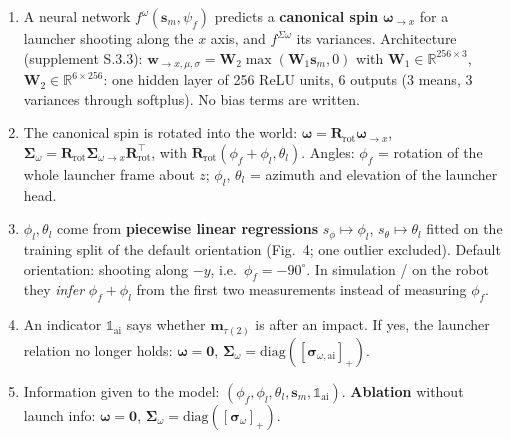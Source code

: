 \documentclass[11pt,a4paper]{article}
\newcommand{\mm}{\mathbf{m}}
\newcommand{\ww}{\boldsymbol{\omega}}
\newcommand{\SSigma}{\boldsymbol{\Sigma}}
\newcommand{\splus}[1]{[#1]_+}
\begin{document}
\begin{enumerate}
\item A neural network $f^\omega(\mathbf s_m,\psi_f)$ predicts a \textbf{canonical spin} $\ww_{\rightarrow x}$ for a launcher shooting along the $x$ axis, and $f^{\Sigma\omega}$ its variances. Architecture (supplement S.3.3):
$\mathbf w_{\rightarrow x,\mu,\sigma}=\mathbf W_2\max(\mathbf W_1\mathbf s_m,0)$ with $\mathbf W_1\in\mathbb R^{256\times3}$, $\mathbf W_2\in\mathbb R^{6\times256}$: one hidden layer of 256 ReLU units, 6 outputs (3 means, 3 variances through softplus). No bias terms are written.
\item The canonical spin is rotated into the world: $\ww=\mathbf R_{\text{rot}}\ww_{\rightarrow x}$, $\SSigma_\omega=\mathbf R_{\text{rot}}\SSigma_{\omega\rightarrow x}\mathbf R_{\text{rot}}^\top$, with $\mathbf R_{\text{rot}}(\phi_f+\phi_l,\theta_l)$.
Angles: $\phi_f$ = rotation of the whole launcher frame about $z$; $\phi_l$, $\theta_l$ = azimuth and elevation of the launcher head.
\item $\phi_l,\theta_l$ come from \textbf{piecewise linear regressions} $s_\phi\mapsto\phi_l$, $s_\theta\mapsto\theta_l$ fitted on the training split of the default orientation (Fig.~4; one outlier excluded).
Default orientation: shooting along $-y$, i.e.\ $\phi_f=-90^\circ$. In simulation / on the robot they \emph{infer} $\phi_f+\phi_l$ from the first two measurements instead of measuring $\phi_f$.
\item An indicator $\mathbb 1_{\text{ai}}$ says whether $\mm_{\tau(2)}$ is after an impact. If yes, the launcher relation no longer holds: $\ww=\mathbf 0$, $\SSigma_\omega=\mathrm{diag}(\splus{\boldsymbol\sigma_{\omega,\text{ai}}})$.
\item Information given to the model: $(\phi_f,\phi_l,\theta_l,\mathbf s_m,\mathbb 1_{\text{ai}})$. \textbf{Ablation} without launch info: $\ww=\mathbf 0$, $\SSigma_\omega=\mathrm{diag}(\splus{\boldsymbol\sigma_\omega})$.
\end{enumerate}
\end{document}
